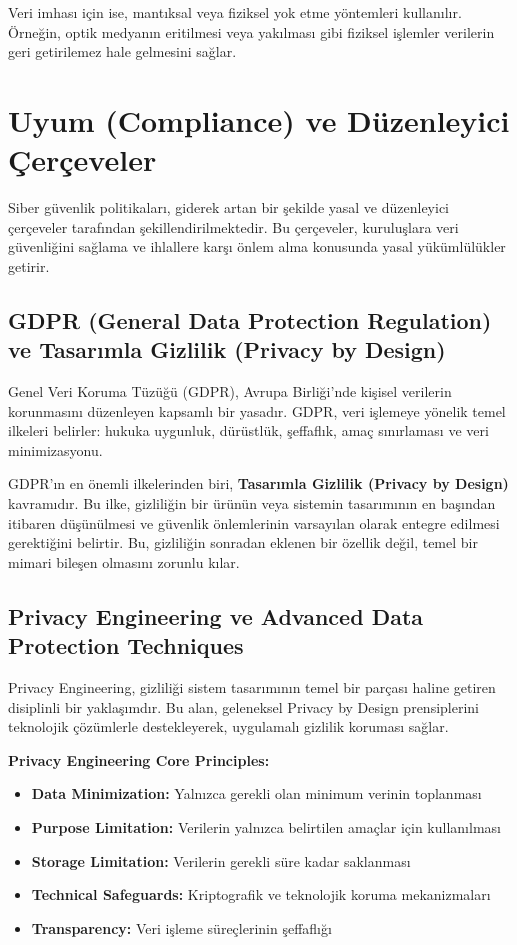 Veri imhası için ise, mantıksal veya fiziksel yok etme yöntemleri kullanılır. Örneğin, optik medyanın eritilmesi veya yakılması gibi fiziksel işlemler verilerin geri getirilemez hale gelmesini sağlar.

\section{Uyum (Compliance) ve Düzenleyici Çerçeveler}

Siber güvenlik politikaları, giderek artan bir şekilde yasal ve düzenleyici çerçeveler tarafından şekillendirilmektedir. Bu çerçeveler, kuruluşlara veri güvenliğini sağlama ve ihlallere karşı önlem alma konusunda yasal yükümlülükler getirir.

\subsection{GDPR (General Data Protection Regulation) ve Tasarımla Gizlilik (Privacy by Design)}

Genel Veri Koruma Tüzüğü (GDPR), Avrupa Birliği'nde kişisel verilerin korunmasını düzenleyen kapsamlı bir yasadır. GDPR, veri işlemeye yönelik temel ilkeleri belirler: hukuka uygunluk, dürüstlük, şeffaflık, amaç sınırlaması ve veri minimizasyonu.

GDPR'ın en önemli ilkelerinden biri, \textbf{Tasarımla Gizlilik (Privacy by Design)} kavramıdır. Bu ilke, gizliliğin bir ürünün veya sistemin tasarımının en başından itibaren düşünülmesi ve güvenlik önlemlerinin varsayılan olarak entegre edilmesi gerektiğini belirtir. Bu, gizliliğin sonradan eklenen bir özellik değil, temel bir mimari bileşen olmasını zorunlu kılar.

\subsection{Privacy Engineering ve Advanced Data Protection Techniques}

Privacy Engineering, gizliliği sistem tasarımının temel bir parçası haline getiren disiplinli bir yaklaşımdır. Bu alan, geleneksel Privacy by Design prensiplerini teknolojik çözümlerle destekleyerek, uygulamalı gizlilik koruması sağlar.

\textbf{Privacy Engineering Core Principles:}
\begin{itemize}
    \item \textbf{Data Minimization:} Yalnızca gerekli olan minimum verinin toplanması
    \item \textbf{Purpose Limitation:} Verilerin yalnızca belirtilen amaçlar için kullanılması
    \item \textbf{Storage Limitation:} Verilerin gerekli süre kadar saklanması
    \item \textbf{Technical Safeguards:} Kriptografik ve teknolojik koruma mekanizmaları
    \item \textbf{Transparency:} Veri işleme süreçlerinin şeffaflığı
\end{itemize}

